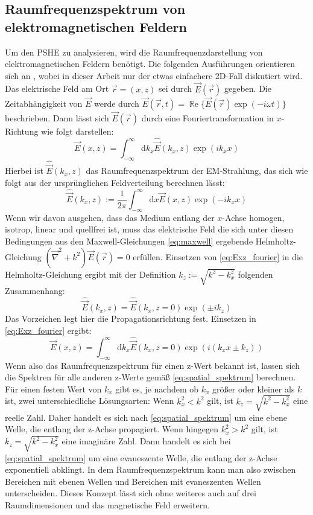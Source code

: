 \documentclass[a4paper, titlepage,  ngerman]{book}
\renewcommand{\Re}{\operatorname{\mathbb{R}e}}
\begin{document}
	\subsection{Raumfrequenzspektrum von elektromagnetischen Feldern}
	Um den PSHE zu analysieren, wird die Raumfrequenzdarstellung von elektromagnetischen Feldern benötigt. Die folgenden Ausführungen orientieren sich an \cite{Novotny.2012b}, wobei in dieser Arbeit nur der etwas einfachere 2D-Fall diskutiert wird.\\		
	Das elektrische Feld am Ort $\vec{r} = (x, z) $ sei durch $\vec{E}({\vec{r}})$ gegeben.
	Die Zeitabhängigkeit von $\vec{E}$ werde durch $\vec{E}({\vec{r}, t})=\Re\{\vec{E}({\vec{r}})\exp(-i\omega t)\}$ beschrieben. Dann lässt sich $\vec{E}({\vec{r}})$ durch eine Fouriertransformation in $x$-Richtung wie folgt darstellen:
	\begin{equation}
		\label{eq:Exz_fourier}
		\vec{E}(x,z) = \int_{-\infty}^{\infty}\mathrm{d}{k_x}\hat{\vec{E}}(k_x,z)\exp(ik_xx)				
	\end{equation}
	Hierbei ist $\hat{\vec{E}}(k_x,z)$ das Raumfrequenzspektrum der EM-Strahlung, das sich wie folgt aus der ursprünglichen Feldverteilung berechnen lässt:
	\begin{equation}
		\label{eq:EKxz_fourier}
		\hat{\vec{E}}(k_x,z) := \dfrac{1}{2\pi}\int_{-\infty}^{\infty}\mathrm{d}x\vec{E}(x,z)\exp(-ik_xx)
	\end{equation}
	Wenn wir davon ausgehen, dass das Medium entlang der $x$-Achse homogen, isotrop, linear und quellfrei ist, muss das elektrische Feld die sich unter diesen Bedingungen aus den Maxwell-Gleichungen \eqref{eq:maxwell} ergebende Helmholtz-Gleichung $(\vec{\nabla}^2+k^2)\vec{E}({\vec{r}}) = 0$ erfüllen. Einsetzen von \eqref{eq:Exz_fourier} in die Helmholtz-Gleichung ergibt mit der Definition $k_z := \sqrt{k^2-k_x^2}$ folgenden Zusammenhang:
	\begin{equation}
		\label{eq:spatial_spektrum}
		\hat{\vec{E}}(k_x,z) =\hat{\vec{E}}(k_x,z= 0) \exp(\pm ik_ z)
	\end{equation}
	Das Vorzeichen legt hier die Propagationsrichtung fest.
	Einsetzen in \eqref{eq:Exz_fourier} ergibt:
	\begin{equation}
		\label{eq:Espatial_spektrum}
		\vec{E}(x,z) = \int_{-\infty}^{\infty}\mathrm{d}{k_x}\hat{\vec{E}}(k_x,z= 0)\exp(i(k_xx\pm k_ z))
	\end{equation}
	Wenn also das Raumfrequenzspektrum für einen z-Wert bekannt ist, lassen sich die Spektren für alle anderen z-Werte gemäß \eqref{eq:spatial_spektrum} berechnen. Für einen festen Wert von $k_x$ gibt es, je nachdem ob $k_x$ größer oder kleiner als $k$ ist, zwei unterschiedliche Lösungsarten: Wenn $k_x^2 < k^2$ gilt, ist $k_z = \sqrt{k^2-k_x^2}$ eine reelle Zahl. Daher handelt es sich nach \eqref{eq:spatial_spektrum} um eine ebene Welle, die entlang der z-Achse propagiert.
	Wenn hingegen $k_x^2 > k^2$ gilt, ist $k_z = \sqrt{k^2-k_x^2}$ eine imaginäre Zahl. Dann handelt es sich bei \eqref{eq:spatial_spektrum} um eine evaneszente Welle, die entlang der z-Achse exponentiell abklingt. In dem Raumfrequenzspektrum kann man also zwischen Bereichen mit ebenen Wellen und Bereichen mit evaneszenten Wellen unterscheiden. Dieses Konzept lässt sich ohne weiteres auch auf drei Raumdimensionen und das magnetische Feld erweitern.
\end{document}
